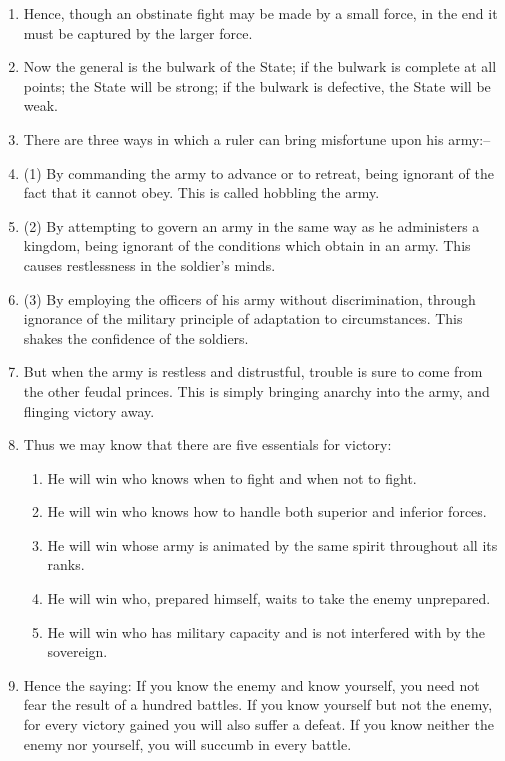 \begin{enumerate}
\item Hence, though an obstinate fight may be made by a small force,
  in the end it must be captured by the larger force.

\item Now the general is the bulwark of the State; if the bulwark is
  complete at all points; the State will be strong; if the bulwark is
  defective, the State will be weak.

\item There are three ways in which a ruler can bring misfortune upon
  his army:--

\item (1) By commanding the army to advance or to retreat, being
  ignorant of the fact that it cannot obey. This is called hobbling
  the army.

\item (2) By attempting to govern an army in the same way as he
  administers a kingdom, being ignorant of the conditions which obtain
  in an army. This causes restlessness in the soldier's minds.

\item (3) By employing the officers of his army without
  discrimination, through ignorance of the military principle of
  adaptation to circumstances. This shakes the confidence of the
  soldiers.

\item But when the army is restless and distrustful, trouble is sure
  to come from the other feudal princes. This is simply bringing
  anarchy into the army, and flinging victory away.

\item Thus we may know that there are five essentials for victory:
  \begin{enumerate}
  \item He will win who knows when to fight and when not to
    fight. \item He will win who knows how to handle both superior and
    inferior forces.
  \item He will win whose army is animated by the same spirit
    throughout all its ranks. \item He will win who, prepared himself,
    waits to take the enemy unprepared. \item He will win who has
    military capacity and is not interfered with by the sovereign.
  \end{enumerate}

\item Hence the saying: If you know the enemy and know yourself, you
  need not fear the result of a hundred battles. If you know yourself
  but not the enemy, for every victory gained you will also suffer a
  defeat. If you know neither the enemy nor yourself, you will succumb
  in every battle.

\end{enumerate}
